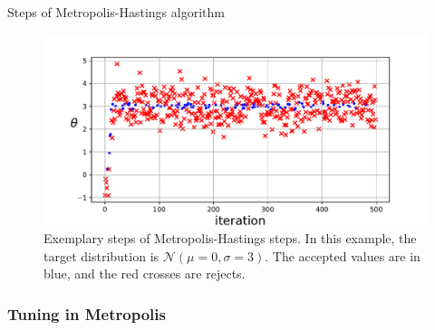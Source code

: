 
\begin{algorithm}[ht]
\caption{Steps of Metropolis-Hastings algorithm }
\label{alg:metropolis}
\end{algorithm}






\begin{figure}[ht]
  \centering
  \includegraphics[width=0.8\linewidth]{figures/chapter3/random_walk.pdf}
  \caption{ Exemplary steps of Metropolis-Hastings steps. In this example, the target distribution is $\mathcal{N}(\mu=0, \sigma=3)$. The accepted values are in blue, and the red crosses are rejects.}
  \label{fig:random_walk}
\end{figure}


\subsubsection{Tuning in Metropolis}
\label{chap3:tuning_metropolis}

